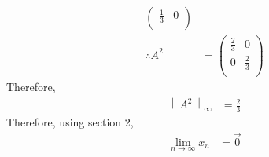 \documentclass[fleqn, a4paper, 11pt, oneside]{amsart}
\theoremstyle{definition}
\theoremstyle{theorem}
\begin{document}
\begin{solution}
\begin{enumerate}[leftmargin=*]
\begin{align*}
\begin{pmatrix}
						\frac{1}{3} & 0 \\
					\end{pmatrix}\\
				\therefore A^2 &=
					\begin{pmatrix}
						\frac{2}{3} & 0           \\
						0           & \frac{2}{3} \\
					\end{pmatrix}
			\end{align*}
			Therefore,
			\begin{align*}
				\left\| A^2 \right\|_{\infty} & = \frac{2}{3}
			\end{align*}
			Therefore, using section 2,
			\begin{align*}
				\lim\limits_{n \to \infty} x_n & = \overrightarrow{0}
			\end{align*}
	\end{enumerate}
\end{solution}
\end{document}
